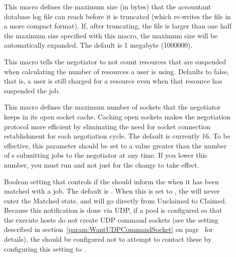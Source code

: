 \begin{description}
\item[] 
  \label{param:MaxAccountantDatabaseSize}
  This macro defines the maximum size (in bytes) that the accountant
  database log file can reach before it is truncated (which re-writes
  the file in a more compact format).
  If, after truncating, the file is larger than one half the maximum
  size specified with this macro, the maximum size will be
  automatically expanded.
  The default is 1 megabyte (1000000).

\item[] \label{param:NegotiatorDiscountSuspendedResources} 
   This macro tells the negotiator to not count resources that are suspended
   when calculating the number of resources a user is using. 
   Defaults to false, that is, a user is still charged for a resource even
   when that resource has suspended the job.

\item[]
  \label{param:NegotiatorSocketCacheSize} This macro defines the
  maximum number of sockets that the negotiator keeps in its
  open socket cache.  Caching open sockets makes the negotiation
  protocol more efficient by eliminating the need for socket
  connection establishment for each negotiation cycle.  The default is
  currently 16.  To be effective, this parameter should be set to a
  value greater than the number of s submitting jobs to the
  negotiator at any time.  If you lower this number, you must run
   and not just  for the change to
  take effect.

\item[]
  \label{param:NegotiatorInformStartd}
  Boolean setting that controls if the  should
  inform the  when it has been matched with a job.
  The default is .
  When this is set to , the  will never
  enter the Matched state, and will go directly from Unclaimed to
  Claimed.
  Because this notification is done via UDP, if a pool is configured
  so that the execute hosts do not create UDP command sockets (see the
   setting described in
  section~\ref{param:WantUDPCommandSocket} on
  page~\pageref{param:WantUDPCommandSocket} for details), the
   should be configured not to attempt to contact
  these  by configuring this setting to .


\end{description}
